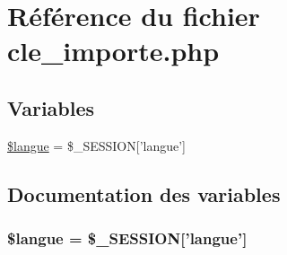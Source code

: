 \hypertarget{cle__importe_8php}{
\section{R\'{e}f\'{e}rence du fichier cle\_\-importe.php}
\label{cle__importe_8php}
}
\subsection*{Variables}
\begin{CompactItemize}
\item 
\hyperlink{cle__importe_8php_a0}{\$langue} = \$\_\-SESSION\mbox{[}'langue'\mbox{]}
\end{CompactItemize}


\subsection{Documentation des variables}
\hypertarget{cle__importe_8php_a0}{
\subsubsection[\$langue]{\setlength{\rightskip}{0pt plus 5cm}\$langue = \$\_\-SESSION\mbox{[}'langue'\mbox{]}}}
\label{cle__importe_8php_a0}


